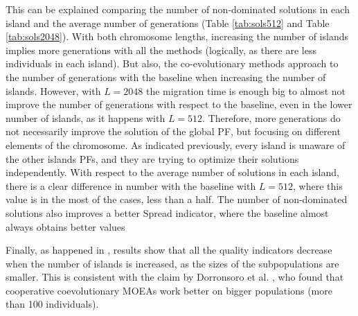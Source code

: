 \documentclass[preprint]{elsarticle}
\begin{document}
This can be explained comparing the number of non-dominated solutions in each island and the average number of generations (Table \ref{tab:sols512} and Table \ref{tab:sols2048}). With both chromosome lengths, increasing the number of islands implies more generations with all the methods (logically, as there are less individuals in each island). But also, the co-evolutionary methods approach to the number of generations with the baseline when increasing the number of islands. However, with $L=2048$ the migration time is enough big to almost not improve the number of generations with respect to the baseline, even in the lower number of islands, as it happens with $L=512$. Therefore, more generations do not necessarily improve the solution of the global PF, but focusing on different elements of the chromosome. As indicated previously, every island is unaware of the other islands PFs, and they are trying to optimize their solutions independently. With respect to the average number of solutions in each island, there is a clear difference in number with the baseline with $L=512$, where this value is in the most of the cases, less than a half. The number of non-dominated solutions also improves a better Spread indicator, where the baseline almost always obtains better values %

Finally, as happened in \citep{Garcia16hpmoon}, results show that all the quality indicators decrease when the number of islands is increased, as the  sizes of the subpopulations are smaller. This is consistent with the claim by Dorronsoro et al. \citep{Dorronsoro13superlinear}, who found that cooperative coevolutionary MOEAs work better on bigger populations (more than 100 individuals).


\end{document}
